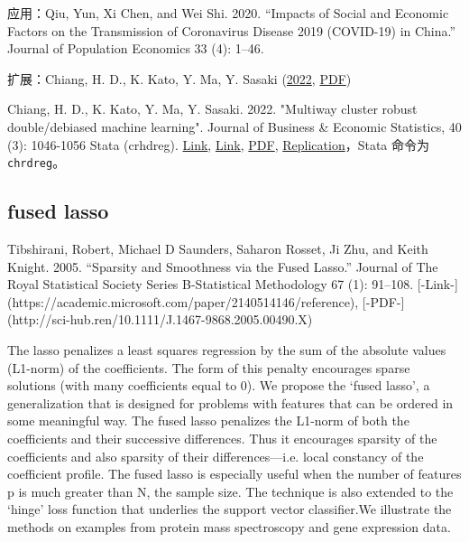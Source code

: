 {%


应用：Qiu, Yun, Xi Chen, and Wei Shi. 2020. “Impacts of Social and Economic Factors on the Transmission of Coronavirus Disease 2019 (COVID-19) in China.” Journal of Population Economics 33 (4): 1–46. 


扩展：Chiang, H. D., K. Kato, Y. Ma, Y. Sasaki (\href{https://doi.org/10.1080/07350015.2021.1895815}{2022}, \href{http://sci-hub.ren/10.1080/07350015.2021.1895815}{PDF})

Chiang, H. D., K. Kato, Y. Ma, Y. Sasaki. 2022. "Multiway cluster robust double/debiased machine learning". Journal of Business \& Economic Statistics, 40 (3): 1046-1056 Stata (crhdreg). \href{https://doi.org/10.1080/07350015.2021.1895815}{Link}, \href{https://doi.org/10.1080/07350015.2021.1895815}{Link}, \href{http://sci-hub.ren/10.1080/07350015.2021.1895815}{PDF}, \href{https://www.tandfonline.com/doi/suppl/10.1080/07350015.2021.1895815?scroll=top}{Replication}，Stata 命令为 \texttt{chrdreg}。

\subsection{fused lasso}

Tibshirani, Robert, Michael D Saunders, Saharon Rosset, Ji Zhu, and Keith Knight. 2005. “Sparsity and Smoothness via the Fused Lasso.” Journal of The Royal Statistical Society Series B-Statistical Methodology 67 (1): 91–108. [-Link-](https://academic.microsoft.com/paper/2140514146/reference), [-PDF-](http://sci-hub.ren/10.1111/J.1467-9868.2005.00490.X)

The lasso penalizes a least squares regression by the sum of the absolute values (L1-norm) of the coefficients. The form of this penalty encourages sparse solutions (with many coefficients equal to 0). We propose the ‘fused lasso’, a generalization that is designed for problems with features that can be ordered in some meaningful way. The fused lasso penalizes the L1-norm of both the coefficients and their successive differences. Thus it encourages sparsity of the coefficients and also sparsity of their differences—i.e. local constancy of the coefficient profile. The fused lasso is especially useful when the number of features p is much greater than N, the sample size. The technique is also extended to the ‘hinge’ loss function that underlies the support vector classifier.We illustrate the methods on examples from protein mass spectroscopy and gene expression data.


}
